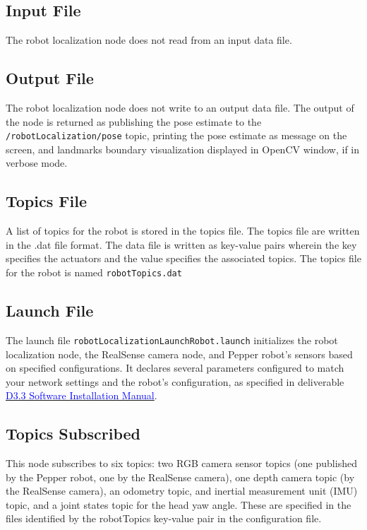 \documentclass{CSSRforAfrica}
\begin{document}
\subsection*{Input File}
The robot localization node does not read from an input data file.

\subsection*{Output File}
The robot localization node does not write to an output data file. The output of the node is returned as publishing the pose estimate to the \texttt{/robotLocalization/pose} topic, printing the pose estimate as message on the screen, and landmarks boundary visualization displayed in OpenCV window, if in verbose mode. 

\subsection*{Topics File}
A list of topics for the robot is stored in the topics file. The topics file are written in the .dat file format. The data file is written as key-value pairs wherein the key specifies the actuators and the value specifies the associated topics. The topics file for the robot is named \texttt{robotTopics.dat}

\subsection*{Launch File}
The launch file \texttt{robotLocalizationLaunchRobot.launch} initializes the robot localization node, the RealSense camera node, and Pepper robot's sensors based on specified configurations. It declares several parameters configured to match your network settings and the robot's configuration, as specified in deliverable \href{https://cssr4africa.github.io/deliverables/CSSR4Africa_Deliverable_D3.3.pdf}{\textcolor{blue}{D3.3 Software Installation Manual}}.

\subsection*{Topics Subscribed}
This node subscribes to six topics: two RGB camera sensor topics (one published by the Pepper robot, one by the RealSense camera), one depth camera topic (by the RealSense camera), an odometry topic, and inertial measurement unit (IMU) topic, and a joint states topic for the head yaw angle. These are specified in the files identified by the robotTopics key-value pair in the configuration file.
\end{document}
